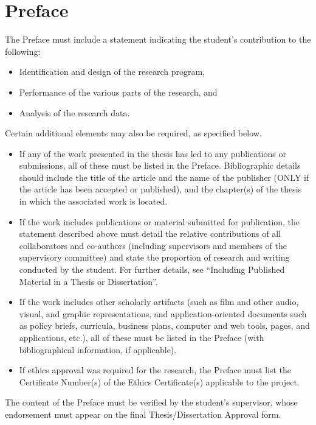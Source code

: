 
\chapter{Preface}

The Preface must include a statement indicating the student's contribution to the following:

\begin{itemize}
  \item Identification and design of the research program,
  \item Performance of the various parts of the research, and
  \item Analysis of the research data.
\end{itemize}

Certain additional elements may also be required, as specified below.

\begin{itemize}
  \item If any of the work presented in the thesis has led to any publications or submissions, all of these must be listed in the Preface. Bibliographic details should include the title of the article and the name of the publisher (ONLY if the article has been accepted or published), and the chapter(s) of the thesis in which the associated work is located.
  \item If the work includes publications or material submitted for publication, the statement described above must detail the relative contributions of all collaborators and co-authors (including supervisors and members of the supervisory committee) and state the proportion of research and writing conducted by the student. For further details, see “Including Published Material in a Thesis or Dissertation”.
  \item If the work includes other scholarly artifacts (such as film and other audio, visual, and graphic representations, and application-oriented documents such as policy briefs, curricula, business plans, computer and web tools, pages, and applications, etc.), all of these must be listed in the Preface (with bibliographical information, if applicable).
  \item If ethics approval was required for the research, the Preface must list the Certificate Number(s) of the Ethics Certificate(s) applicable to the project.
\end{itemize}

The content of the Preface must be verified by the student's supervisor, whose endorsement must appear on the final Thesis/Dissertation Approval form.